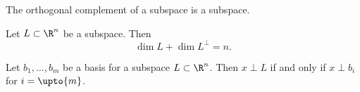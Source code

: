 


\begin{prop}

The orthogonal complement of a subspace is a subspace.

\end{prop}

\begin{prop}
  Let $L \subset \R^n$ be a subspace. Then
  $$
    \dim L + \dim L^{\perp} = n.
  $$
\end{prop}

\begin{prop}
  Let $b_1, \dots, b_m$ be a basis for a subspace $L \subset \R^n$. Then $x \perp L$ if and only if $x \perp b_i$ for $i = \upto{m}$.
\end{prop}

